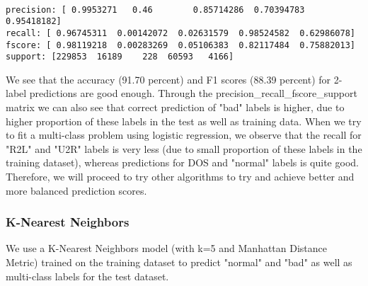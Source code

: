 \documentclass[11pt]{article}
\begin{document}
    \begin{center}
    \end{center}
    { \hspace*{\fill} \\}
    
    \begin{Verbatim}[commandchars=\\\{\}]
precision: [ 0.9953271   0.46        0.85714286  0.70394783  0.95418182]
recall: [ 0.96745311  0.00142072  0.02631579  0.98524582  0.62986078]
fscore: [ 0.98119218  0.00283269  0.05106383  0.82117484  0.75882013]
support: [229853  16189    228  60593   4166]

    \end{Verbatim}

    We see that the accuracy (91.70 percent) and F1 scores (88.39 percent)
for 2-label predictions are good enough. Through the
precision\_recall\_fscore\_support matrix we can also see that correct
prediction of "bad" labels is higher, due to higher proportion of these
labels in the test as well as training data. When we try to fit a
multi-class problem using logistic regression, we observe that the
recall for "R2L" and "U2R" labels is very less (due to small proportion
of these labels in the training dataset), whereas predictions for DOS
and "normal" labels is quite good. Therefore, we will proceed to try
other algorithms to try and achieve better and more balanced prediction
scores.

    \subsubsection{K-Nearest Neighbors}\label{k-nearest-neighbors}

We use a K-Nearest Neighbors model (with k=5 and Manhattan Distance
Metric) trained on the training dataset to predict "normal" and "bad" as
well as multi-class labels for the test dataset.
\end{document}
